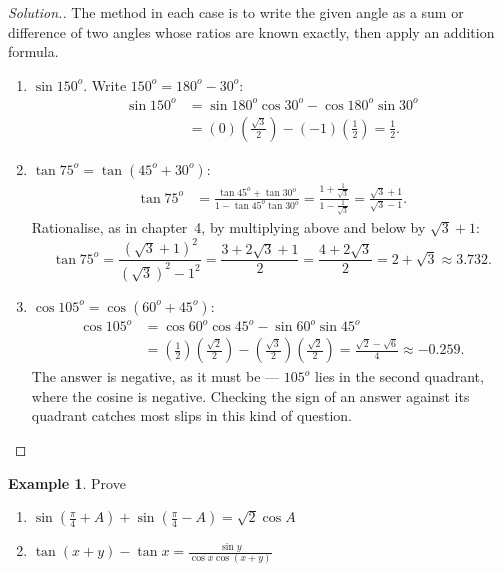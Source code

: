 \documentclass[11pt,a4paper]{article}
\theoremstyle{definition}
\newtheorem{example}[thm]{Example}
\newenvironment{solution}
  {\renewcommand{\qedsymbol}{}\begin{proof}[\textit{Solution}.]}
  {\end{proof}}
\begin{document}
\begin{solution}

The method in each case is to write the given angle as a sum or difference of two
angles whose ratios are known exactly, then apply an addition formula.

\begin{enumerate}
\item[(i).] $\sin 150^{o}$. Write $150^{o}=180^{o}-30^{o}$:
\begin{align*}
\sin 150^{o} &= \sin 180^{o}\cos 30^{o} - \cos 180^{o}\sin 30^{o}\\
             &= (0)\left(\tfrac{\sqrt{3}}{2}\right) - (-1)\left(\tfrac{1}{2}\right)
              = \frac{1}{2} .
\end{align*}

\item[(ii).] $\tan 75^{o}=\tan(45^{o}+30^{o})$:
\begin{align*}
\tan 75^o & = \frac{\tan 45^o + \tan 30^o}{1 - \tan 45^o\tan 30^o}
            = \frac{1 + \frac{1}{\sqrt{3}}}{1 - \frac{1}{\sqrt{3}}}
            = \frac{\sqrt{3} + 1}{\sqrt{3} - 1} .
\end{align*}
Rationalise, as in chapter~4, by multiplying above and below by $\sqrt{3}+1$:
$$\tan 75^{o}=\frac{\left(\sqrt{3}+1\right)^{2}}{\left(\sqrt{3}\right)^{2}-1^{2}}
=\frac{3+2\sqrt{3}+1}{2}=\frac{4+2\sqrt{3}}{2}=2+\sqrt{3}\approx 3.732 .$$

\item[(iii).] $\cos 105^{o}=\cos(60^{o}+45^{o})$:
\begin{align*}
\cos 105^{o} &= \cos 60^{o}\cos 45^{o} - \sin 60^{o}\sin 45^{o}\\
             &= \left(\tfrac{1}{2}\right)\left(\tfrac{\sqrt{2}}{2}\right)
               -\left(\tfrac{\sqrt{3}}{2}\right)\left(\tfrac{\sqrt{2}}{2}\right)
              = \frac{\sqrt{2}-\sqrt{6}}{4}\approx -0.259 .
\end{align*}
The answer is negative, as it must be --- $105^{o}$ lies in the second quadrant,
where the cosine is negative. Checking the sign of an answer against its quadrant
catches most slips in this kind of question.
\end{enumerate}
\end{solution}
\begin{example}

Prove
\begin{enumerate}
\item[i.] $\sin \left(\frac{\pi}{4} + A\right) + \sin \left( \frac{\pi}{4} - A\right)  = \sqrt{2}\cos A$\\

\item[ii.] $\tan (x + y)  - \tan x = \frac{\sin y }{\cos x \cos (x + y)}$\\\\
\end{enumerate}
\end{example}
\end{document}
